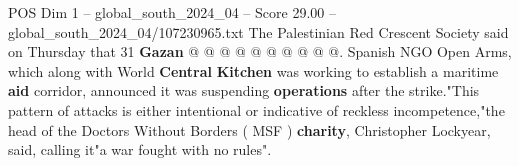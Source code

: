 \begin{textsample}{POS Dim 1 – global\_south\_2024\_04 – Score 29.00 – global\_south\_2024\_04/107230965.txt}
The Palestinian Red Crescent Society said on Thursday that 31 \textbf{Gazan} @ @ @ @ @ @ @ @ @ @.
Spanish NGO Open Arms, which along with World \textbf{Central} \textbf{Kitchen} was working to establish a maritime \textbf{aid} corridor, announced it was suspending \textbf{operations} after the strike."This pattern of attacks is either intentional or indicative of reckless incompetence,"the head of the Doctors Without Borders ( MSF ) \textbf{charity}, Christopher Lockyear, said, calling it"a war fought with no rules".

\end{textsample}
